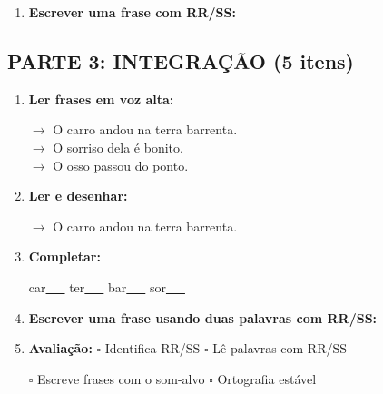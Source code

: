 \begin{exercicio}
\begin{enumerate}[resume]
  \item \textbf{Escrever uma frase com RR/SS:}
  \begin{center}
  \underline{\hspace{12cm}}
  \end{center}

\end{enumerate}

\subsection*{PARTE 3: INTEGRAÇÃO (5 itens)}

\begin{enumerate}[resume]

  \item \textbf{Ler frases em voz alta:}
  \begin{center}
  $\rightarrow$ O carro andou na terra barrenta.\\
  $\rightarrow$ O sorriso dela é bonito.\\
  $\rightarrow$ O osso passou do ponto.\\
  \end{center}

  \item \textbf{Ler e desenhar:}
  \begin{center}
  $\rightarrow$ O carro andou na terra barrenta.
  \end{center}
  \begin{center}
  \end{center}

  \item \textbf{Completar:}
  \begin{center}
  car\underline{~~~} \quad ter\underline{~~~} \quad bar\underline{~~~} \quad sor\underline{~~~}
  \end{center}

  \item \textbf{Escrever uma frase usando duas palavras com RR/SS:}
  \begin{center}
  \underline{\hspace{12cm}}
  \end{center}

  \item \textbf{Avaliação:} $\square$ Identifica RR/SS \quad $\square$ Lê palavras com RR/SS
  \begin{center}
  $\square$ Escreve frases com o som-alvo \quad $\square$ Ortografia estável
  \end{center}


\end{enumerate}
\end{exercicio}
